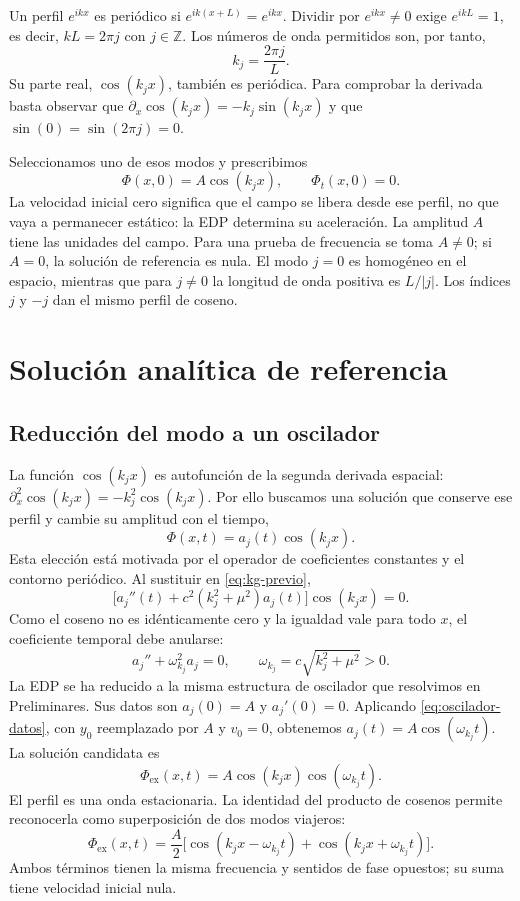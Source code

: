 Un perfil $e^{ikx}$ es periódico si $e^{ik(x+L)}=e^{ikx}$. Dividir por
$e^{ikx}\ne0$ exige $e^{ikL}=1$, es decir, $kL=2\pi j$ con $j\in\mathbb Z$.
Los números de onda permitidos son, por tanto,
\begin{equation}
k_j=\frac{2\pi j}{L}.
\label{eq:modos-periodicos}
\end{equation}
Su parte real, $\cos(k_jx)$, también es periódica. Para comprobar la
derivada basta observar que $\partial_x\cos(k_jx)=-k_j\sin(k_jx)$
y que $\sin(0)=\sin(2\pi j)=0$.

Seleccionamos uno de esos modos y prescribimos
\begin{equation}
\Phi(x,0)=A\cos(k_jx),\qquad \Phi_t(x,0)=0.
\label{eq:datos-previo}
\end{equation}
La velocidad inicial cero significa que el campo se libera desde ese perfil,
no que vaya a permanecer estático: la EDP determina su aceleración.
La amplitud $A$ tiene las unidades del campo. Para una prueba de frecuencia
se toma $A\ne0$; si $A=0$, la solución de referencia es nula. El modo $j=0$
es homogéneo en el espacio, mientras que para $j\ne0$ la longitud de onda
positiva es $L/|j|$. Los índices $j$ y $-j$ dan el mismo perfil de coseno.

\section{Solución analítica de referencia}

\subsection{Reducción del modo a un oscilador}
La función $\cos(k_jx)$ es autofunción de la segunda derivada espacial:
$\partial_x^2\cos(k_jx)=-k_j^2\cos(k_jx)$. Por ello buscamos una solución
que conserve ese perfil y cambie su amplitud con el tiempo,
\[
\Phi(x,t)=a_j(t)\cos(k_jx).
\]
Esta elección está motivada por el operador de coeficientes constantes y
el contorno periódico. Al sustituir en \eqref{eq:kg-previo},
\[
\bigl[a_j''(t)+c^2(k_j^2+\mu^2)a_j(t)\bigr]\cos(k_jx)=0.
\]
Como el coseno no es idénticamente cero y la igualdad vale para todo $x$,
el coeficiente temporal debe anularse:
\[
a_j''+\omega_{k_j}^2a_j=0,\qquad
\omega_{k_j}=c\sqrt{k_j^2+\mu^2}>0.
\]
La EDP se ha reducido a la misma estructura de oscilador que resolvimos
en Preliminares. Sus datos son $a_j(0)=A$ y $a_j'(0)=0$. Aplicando
\eqref{eq:oscilador-datos}, con $y_0$ reemplazado por $A$ y $v_0=0$,
obtenemos $a_j(t)=A\cos(\omega_{k_j}t)$. La solución candidata es
\begin{equation}
\Phi_{\mathrm{ex}}(x,t)=A\cos(k_jx)\cos(\omega_{k_j}t).
\label{eq:solucion-exacta-previo}
\end{equation}
El perfil es una onda estacionaria. La identidad del producto de cosenos
permite reconocerla como superposición de dos modos viajeros:
\[
\Phi_{\mathrm{ex}}(x,t)=\frac A2
\bigl[\cos(k_jx-\omega_{k_j}t)+\cos(k_jx+\omega_{k_j}t)\bigr].
\]
Ambos términos tienen la misma frecuencia y sentidos de fase opuestos;
su suma tiene velocidad inicial nula.

